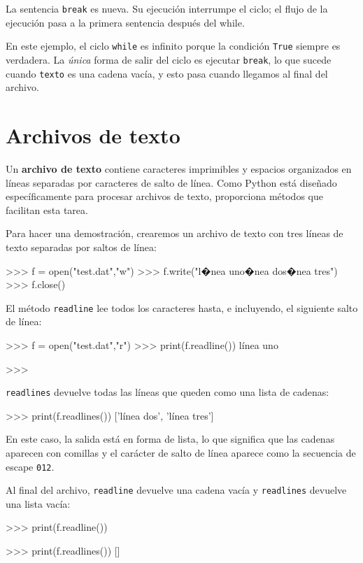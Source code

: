 La sentencia \texttt{break} es nueva. Su ejecución interrumpe el ciclo;
el flujo de la ejecución pasa a la primera sentencia después del while.

 

En este ejemplo, el ciclo \texttt{while} es infinito porque la condición
\texttt{True} siempre es verdadera. La {\em única} forma de salir
del ciclo es ejecutar \texttt{break}, lo que sucede cuando \texttt{texto}
es una cadena vacía, y esto pasa cuando llegamos al final del archivo.

\section{Archivos de texto}

 

Un \textbf{archivo de texto} contiene caracteres imprimibles y espacios
organizados en líneas separadas por caracteres de salto de línea.
Como Python está diseñado específicamente para procesar archivos de
texto, proporciona métodos que facilitan esta tarea.

Para hacer una demostración, crearemos un archivo de texto con tres
líneas de texto separadas por saltos de línea:
\begin{pyconcode}
>>> f = open("test.dat","w")
>>> f.write("l�nea uno\nl�nea dos\nl�nea tres\n")
>>> f.close()
\end{pyconcode}

El método \texttt{readline} lee todos los caracteres hasta, e incluyendo,
el siguiente salto de línea:
\begin{pyconcode}
>>> f = open("test.dat","r")
>>> print(f.readline())
línea uno

>>>
\end{pyconcode}

\texttt{readlines} devuelve todas las líneas que queden como una lista
de cadenas:
\begin{pyconcode}
>>> print(f.readlines())
['línea dos', 'línea tres']
\end{pyconcode}

En este caso, la salida está en forma de lista, lo que significa que
las cadenas aparecen con comillas y el carácter de salto de línea
aparece como la secuencia de escape \texttt{012}.

Al final del archivo, \texttt{readline} devuelve una cadena vacía
y \texttt{readlines} devuelve una lista vacía:
\begin{pyconcode}
>>> print(f.readline())

>>> print(f.readlines())
[]
\end{pyconcode}


